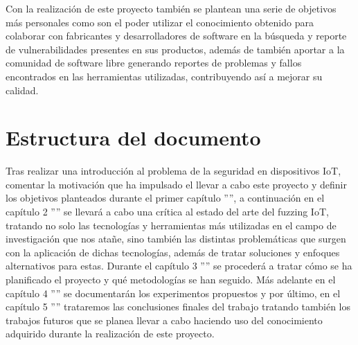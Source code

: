 Con la realización de este proyecto también se plantean una serie de objetivos más personales como son el poder utilizar el conocimiento obtenido 
para colaborar con fabricantes y desarrolladores de software en la búsqueda y reporte de vulnerabilidades presentes en sus productos, además de también
aportar a la comunidad de software libre generando reportes de problemas y fallos encontrados en las herramientas utilizadas, contribuyendo así
a mejorar su calidad. 

\section{Estructura del documento}
Tras realizar una introducción al problema de la seguridad en dispositivos IoT, comentar la motivación que ha impulsado
el llevar a cabo este proyecto y definir los objetivos planteados durante el primer capítulo '''', a continuación en el capítulo 2
'''' se llevará a cabo una crítica al estado del arte del fuzzing IoT, tratando no solo las tecnologías y herramientas 
más utilizadas en el campo de investigación que nos atañe, sino también las distintas problemáticas que surgen con 
la aplicación de dichas tecnologías, además de tratar soluciones y enfoques alternativos para estas.
Durante el capítulo 3 '''' se procederá a tratar cómo se ha planificado el proyecto y qué metodologías se han seguido. Más adelante en el 
capítulo 4 '''' se documentarán los experimentos propuestos y por último, en el capítulo 5 '''' trataremos las conclusiones finales del trabajo tratando también los trabajos futuros que se planea llevar a cabo haciendo uso del conocimiento adquirido durante la realización de este proyecto.